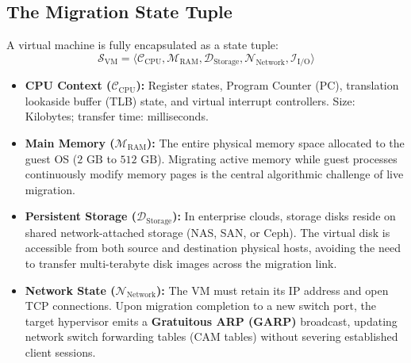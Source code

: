 \subsection{The Migration State Tuple}
A virtual machine is fully encapsulated as a state tuple:
\begin{equation}
\mathcal{S}_{\text{VM}} = \langle \mathcal{C}_{\text{CPU}}, \mathcal{M}_{\text{RAM}}, \mathcal{D}_{\text{Storage}}, \mathcal{N}_{\text{Network}}, \mathcal{I}_{\text{I/O}} \rangle
\end{equation}
\begin{itemize}[leftmargin=*]
  \item \textbf{CPU Context ($\mathcal{C}_{\text{CPU}}$):} Register states, Program Counter (PC), translation lookaside buffer (TLB) state, and virtual interrupt controllers. Size: Kilobytes; transfer time: milliseconds.
  \item \textbf{Main Memory ($\mathcal{M}_{\text{RAM}}$):} The entire physical memory space allocated to the guest OS ($2\text{ GB}$ to $512\text{ GB}$). Migrating active memory while guest processes continuously modify memory pages is the central algorithmic challenge of live migration.
  \item \textbf{Persistent Storage ($\mathcal{D}_{\text{Storage}}$):} In enterprise clouds, storage disks reside on shared network-attached storage (NAS, SAN, or Ceph). The virtual disk is accessible from both source and destination physical hosts, avoiding the need to transfer multi-terabyte disk images across the migration link.
  \item \textbf{Network State ($\mathcal{N}_{\text{Network}}$):} The VM must retain its IP address and open TCP connections. Upon migration completion to a new switch port, the target hypervisor emits a \textbf{Gratuitous ARP (GARP)} broadcast, updating network switch forwarding tables (CAM tables) without severing established client sessions.
\end{itemize}

